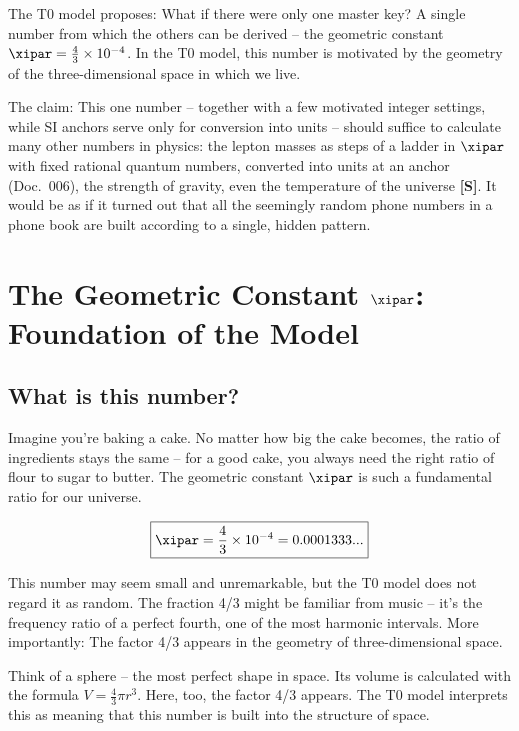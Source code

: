 	\begin{revolutionary}
		The T0 model proposes: What if there were only one master key? A single number from which the others can be derived -- the geometric constant $\xipar = \frac{4}{3} \times 10^{-4}$. In the T0 model, this number is motivated by the geometry of the three-dimensional space in which we live.
	\end{revolutionary}
	
	The claim: This one number -- together with a few motivated integer settings, while SI anchors serve only for conversion into units -- should suffice to calculate many other numbers in physics: the lepton masses as steps of a ladder in $\xipar$ with fixed rational quantum numbers, converted into units at an anchor (Doc.~006), the strength of gravity, even the temperature of the universe \textbf{[S]}. It would be as if it turned out that all the seemingly random phone numbers in a phone book are built according to a single, hidden pattern.
	
	\section{The Geometric Constant $\xipar$: Foundation of the Model}
	
	\subsection{What is this number?}
	
	Imagine you're baking a cake. No matter how big the cake becomes, the ratio of ingredients stays the same -- for a good cake, you always need the right ratio of flour to sugar to butter. The geometric constant $\xipar$ is such a fundamental ratio for our universe.
	
	\begin{equation}
		\boxed{\xipar = \frac{4}{3} \times 10^{-4} = 0.0001333...}
	\end{equation}
	
	This number may seem small and unremarkable, but the T0 model does not regard it as random. The fraction 4/3 might be familiar from music -- it's the frequency ratio of a perfect fourth, one of the most harmonic intervals. More importantly: The factor 4/3 appears in the geometry of three-dimensional space.
	
	Think of a sphere -- the most perfect shape in space. Its volume is calculated with the formula $V = \frac{4}{3}\pi r^3$. Here, too, the factor 4/3 appears. The T0 model interprets this as meaning that this number is built into the structure of space.
	
